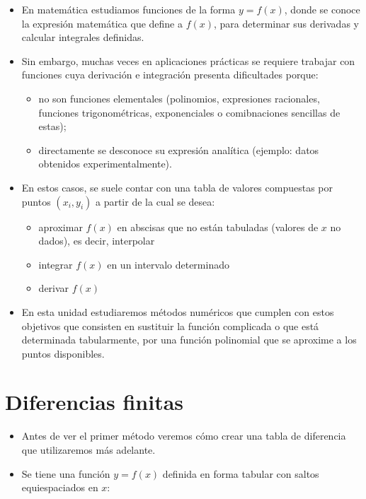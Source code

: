 \documentclass[openany]{book}
\providecommand{\tightlist}{%
  \setlength{\itemsep}{0pt}\setlength{\parskip}{0pt}}
\begin{document}
\begin{itemize}
\item
  En matemática estudiamos funciones de la forma \(y = f(x)\), donde se conoce la expresión matemática que define a \(f(x)\), para determinar sus derivadas y calcular integrales definidas.
\item
  Sin embargo, muchas veces en aplicaciones prácticas se requiere trabajar con funciones cuya derivación e integración presenta dificultades porque:

  \begin{itemize}
  \tightlist
  \item
    no son funciones elementales (polinomios, expresiones racionales, funciones trigonométricas, exponenciales o comibnaciones sencillas de estas);
  \item
    directamente se desconoce su expresión analítica (ejemplo: datos obtenidos experimentalmente).
  \end{itemize}
\item
  En estos casos, se suele contar con una tabla de valores compuestas por puntos \((x_i, y_i)\) a partir de la cual se desea:

  \begin{itemize}
  \tightlist
  \item
    aproximar \(f(x)\) en abscisas que no están tabuladas (valores de \(x\) no dados), es decir, interpolar
  \item
    integrar \(f(x)\) en un intervalo determinado
  \item
    derivar \(f(x)\)
  \end{itemize}
\item
  En esta unidad estudiaremos métodos numéricos que cumplen con estos objetivos que consisten en sustituir la función complicada o que está determinada tabularmente, por una función polinomial que se aproxime a los puntos disponibles.
\end{itemize}

\hypertarget{diferencias-finitas}{%
\section{Diferencias finitas}\label{diferencias-finitas}}

\begin{itemize}
\tightlist
\item
  Antes de ver el primer método veremos cómo crear una tabla de diferencia que utilizaremos más adelante.
\item
  Se tiene una función \(y = f(x)\) definida en forma tabular con saltos equiespaciados en \(x\):
\end{itemize}
\end{document}
